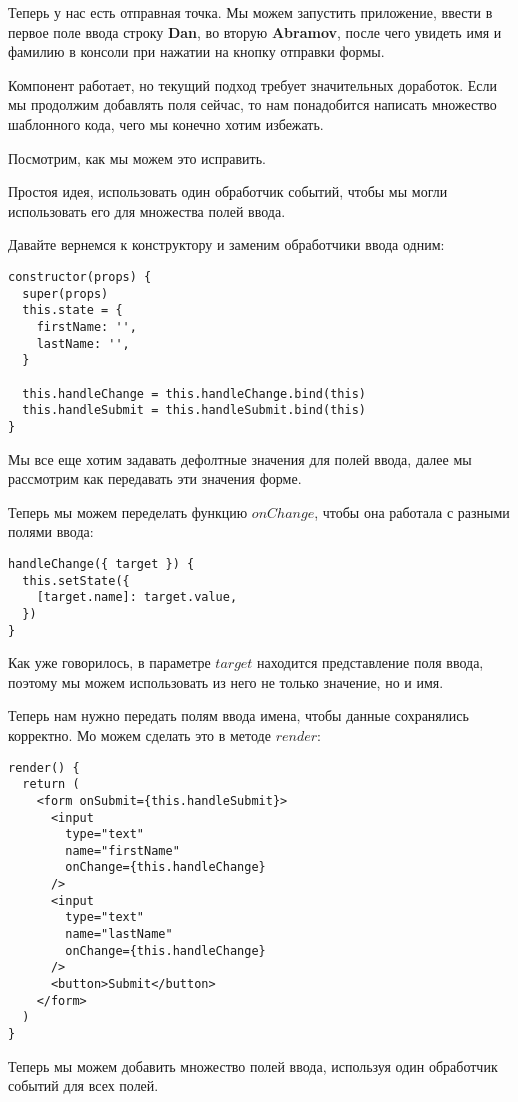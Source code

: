 Теперь у нас есть отправная точка. Мы можем запустить приложение, ввести в первое поле ввода строку \textbf{Dan}, во вторую \textbf{Abramov}, после чего увидеть имя и фамилию в консоли при нажатии на кнопку отправки формы.

Компонент работает, но текущий подход требует значительных доработок. Если мы продолжим добавлять поля сейчас, то нам понадобится написать множество шаблонного кода, чего мы конечно хотим избежать.

Посмотрим, как мы можем это исправить.

Простоя идея, использовать один обработчик событий, чтобы мы могли использовать его для множества полей ввода.

Давайте вернемся к конструктору и заменим обработчики ввода одним:

\begin{lstlisting}
constructor(props) {
  super(props)
  this.state = {
    firstName: '',
    lastName: '',
  }
  
  this.handleChange = this.handleChange.bind(this)
  this.handleSubmit = this.handleSubmit.bind(this)
}
\end{lstlisting}

Мы все еще хотим задавать дефолтные значения для полей ввода, далее мы рассмотрим как передавать эти значения форме.

Теперь мы можем переделать функцию $onChange$, чтобы она работала с разными полями ввода:

\begin{lstlisting}
handleChange({ target }) {
  this.setState({
    [target.name]: target.value,
  })
}
\end{lstlisting}

Как уже говорилось, в параметре $target$ находится представление поля ввода, поэтому мы можем использовать из него не только значение, но и имя.

Теперь нам нужно передать полям ввода имена, чтобы данные сохранялись корректно. Мо можем сделать это в методе $render$:

\begin{lstlisting}
render() {
  return (
    <form onSubmit={this.handleSubmit}>
      <input
        type="text"
        name="firstName"
        onChange={this.handleChange}
      /> 
      <input
        type="text"
        name="lastName"
        onChange={this.handleChange}
      />
      <button>Submit</button>
    </form>
  )
}
\end{lstlisting}

Теперь мы можем добавить множество полей ввода, используя один обработчик событий для всех полей.

